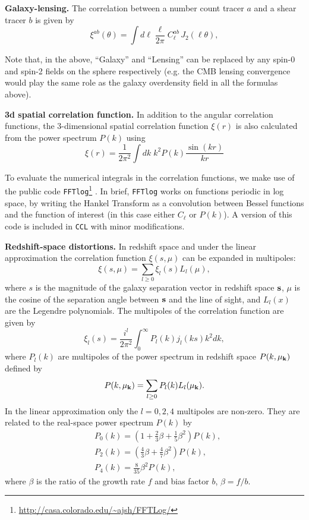 \documentclass[\docopts]{\docclass}
\newcommand{\ccl}{{\tt CCL}\xspace}
\begin{document}
{\bf Galaxy-lensing.} The correlation between a number count tracer $a$ and a shear tracer $b$ is given by
\begin{equation}
  \xi^{ab}(\theta) = \int d\ell \frac{\ell}{2\pi} C^{ab}_\ell\, J_2(\ell\theta),
\end{equation}

Note that, in the above, ``Galaxy'' and ``Lensing'' can be replaced by any spin-0
and spin-2 fields on the sphere respectively (e.g. the CMB lensing convergence would
play the same role as the galaxy overdensity field in all the formulas above).

{\bf 3d spatial correlation function.} In addition to the angular correlation
functions, the 3-dimensional spatial correlation function $\xi(r)$ is also
calculated from the power spectrum $P(k)$ using
\begin{equation}
\xi(r) = \frac{1}{2 \pi^2} \int dk \; k^2 P(k) \frac{\sin(kr)}{kr}
\end{equation}


To evaluate the numerical integrals in the correlation functions, we make use of
the public code {\tt FFTlog}\footnote{\url{http://casa.colorado.edu/~ajsh/FFTLog/}}
\citep{Hamilton2000,Talman2009}. In brief, {\tt FFTlog} works on functions
periodic in log space, by writing the Hankel Transform as a convolution between
Bessel functions and the function of interest (in this case either $C_\ell$ or
$P(k)$). A version of this code is included in \ccl with minor modifications.

{\bf Redshift-space distortions.} In redshift space and under the linear
approximation \citep{Kaiser1987} the correlation function $\xi(s,\mu)$ can be expanded in multipoles:
\begin{equation}
\xi(s,\mu) = \sum_{l\geq 0} \xi_l(s) L_l(\mu),
\end{equation}
where $s$ is the magnitude of the galaxy separation vector in redshift space
$\bf s$, $\mu$ is the cosine of the separation angle between $\bf s$ and the
line of sight, and $L_l(x)$ are the Legendre polynomials. The multipoles of
the correlation function are given by
\begin{equation}
\xi_l(s) = \frac{i^l}{2 \pi^2} \int_0^{\infty} P_l(k) j_l(k s) k^2 dk,
\end{equation}
where $P_l(k)$ are multipoles of the power spectrum in redshift space $P(k,\mu_{\bf k})$ defined by
\begin{equation}
P(k,\mu_{\bf k}) = \sum_{l\geq 0} P_l(k) L_l(\mu_{\bf k}).
\end{equation}
In the linear approximation only the $l = 0,2,4$ multipoles are non-zero. They are related to the
real-space power spectrum $P(k)$ by
\begin{eqnarray}
&P_0(k) = \left(1+\frac{2}{3}\beta+\frac{1}{5}\beta^2\right)P(k),\\
&P_2(k) = \left(\frac{4}{3}\beta+\frac{4}{7}\beta^2\right)P(k),\\
&P_4(k) = \frac{8}{35}\beta^2 P(k),
\end{eqnarray}
where $\beta$ is the ratio of the growth rate $f$ and bias factor $b$, $\beta = f/b$.
\end{document}

